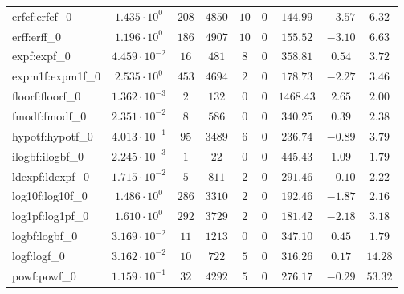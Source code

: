 \begin{tabular}{|l|c|c|c|c|c|c|c|c|}
erfcf:erfcf\_0               & $ 1.435 \cdot 10^{0}  $ & $ 208    $ & $ 4850   $ & $ 10  $ & $ 0   $ & $ 144.99      $ & $ -3.57   $ & $ 6.32    $ \\
erff:erff\_0                 & $ 1.196 \cdot 10^{0}  $ & $ 186    $ & $ 4907   $ & $ 10  $ & $ 0   $ & $ 155.52      $ & $ -3.10   $ & $ 6.63    $ \\
expf:expf\_0                 & $ 4.459 \cdot 10^{-2} $ & $ 16     $ & $ 481    $ & $ 8   $ & $ 0   $ & $ 358.81      $ & $ 0.54    $ & $ 3.72    $ \\
expm1f:expm1f\_0             & $ 2.535 \cdot 10^{0}  $ & $ 453    $ & $ 4694   $ & $ 2   $ & $ 0   $ & $ 178.73      $ & $ -2.27   $ & $ 3.46    $ \\
floorf:floorf\_0             & $ 1.362 \cdot 10^{-3} $ & $ 2      $ & $ 132    $ & $ 0   $ & $ 0   $ & $ 1468.43     $ & $ 2.65    $ & $ 2.00    $ \\
fmodf:fmodf\_0               & $ 2.351 \cdot 10^{-2} $ & $ 8      $ & $ 586    $ & $ 0   $ & $ 0   $ & $ 340.25      $ & $ 0.39    $ & $ 2.38    $ \\
hypotf:hypotf\_0             & $ 4.013 \cdot 10^{-1} $ & $ 95     $ & $ 3489   $ & $ 6   $ & $ 0   $ & $ 236.74      $ & $ -0.89   $ & $ 3.79    $ \\
ilogbf:ilogbf\_0             & $ 2.245 \cdot 10^{-3} $ & $ 1      $ & $ 22     $ & $ 0   $ & $ 0   $ & $ 445.43      $ & $ 1.09    $ & $ 1.79    $ \\
ldexpf:ldexpf\_0             & $ 1.715 \cdot 10^{-2} $ & $ 5      $ & $ 811    $ & $ 2   $ & $ 0   $ & $ 291.46      $ & $ -0.10   $ & $ 2.22    $ \\
log10f:log10f\_0             & $ 1.486 \cdot 10^{0}  $ & $ 286    $ & $ 3310   $ & $ 2   $ & $ 0   $ & $ 192.46      $ & $ -1.87   $ & $ 2.16    $ \\
log1pf:log1pf\_0             & $ 1.610 \cdot 10^{0}  $ & $ 292    $ & $ 3729   $ & $ 2   $ & $ 0   $ & $ 181.42      $ & $ -2.18   $ & $ 3.18    $ \\
logbf:logbf\_0               & $ 3.169 \cdot 10^{-2} $ & $ 11     $ & $ 1213   $ & $ 0   $ & $ 0   $ & $ 347.10      $ & $ 0.45    $ & $ 1.79    $ \\
logf:logf\_0                 & $ 3.162 \cdot 10^{-2} $ & $ 10     $ & $ 722    $ & $ 5   $ & $ 0   $ & $ 316.26      $ & $ 0.17    $ & $ 14.28   $ \\
powf:powf\_0                 & $ 1.159 \cdot 10^{-1} $ & $ 32     $ & $ 4292   $ & $ 5   $ & $ 0   $ & $ 276.17      $ & $ -0.29   $ & $ 53.32   $ \\

\end{tabular}
